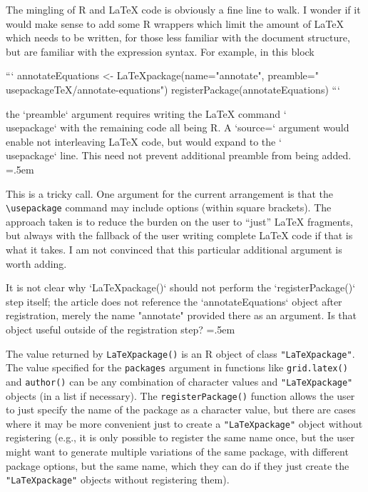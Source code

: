 \documentclass{article}
\newcommand{\code}[1]{\texttt{#1}}
\newenvironment{lcverbatim}
 {\SaveVerbatim{cverb}}
 {\endSaveVerbatim
  \flushleft\fboxrule=0pt\fboxsep=.5em
  \colorbox{cverbbg}{%
    \makebox[\dimexpr\linewidth-2\fboxsep][l]{\BUseVerbatim{cverb}}%
  }
  \endflushleft
}
\begin{document}
\begin{lcverbatim}
  The mingling of R and LaTeX code is obviously a fine line to walk. I wonder if
  it would make sense to add some R wrappers which limit the amount of LaTeX 
  which needs to be written, for those less familiar with the document 
  structure, but are familiar with the expression syntax. For example, in this 
  block

  ```
  annotateEquations <-
      LaTeXpackage(name="annotate",
                   preamble="\\usepackage{TeX/annotate-equations}")
  registerPackage(annotateEquations)
  ```

  the `preamble` argument requires writing the LaTeX command `\\usepackage{}`
  with the remaining code all being R. A `source=` argument would
  enable not interleaving LaTeX code, but would expand to the `\\usepackage{}`
  line. This need not prevent additional preamble from being added.
\end{lcverbatim}

This is a tricky call.  One argument for the current arrangement
is that the \verb|\usepackage| command may include options
(within square brackets).  The approach taken is to reduce the
burden on the user to ``just'' \LaTeX{} fragments, but always 
with the fallback of the user writing complete \LaTeX{} code if 
that is what it takes.
I am not convinced that this particular additional argument is worth adding.

\begin{lcverbatim}
  It is not clear why `LaTeXpackage()` should not perform the 
  `registerPackage()` step itself; the article does not reference the 
  `annotateEquations` object after registration, merely the name "annotate" 
  provided there as an argument. Is that object useful outside of the 
  registration step?
\end{lcverbatim}

The value returned by \code{LaTeXpackage()} is an R object of
class \verb|"LaTeXpackage"|.
The value specified for the \code{packages} argument in functions
like \code{grid.latex()} and \code{author()} can be any combination
of character values and \verb|"LaTeXpackage"| objects (in a list
if necessary).
The \code{registerPackage()} function allows the user to just
specify the name of the package as a character value, but there
are cases where it may be more convenient just to create a
\verb|"LaTeXpackage"| object without registering (e.g.,
it is only possible to register the same name once, but the
user might want to generate multiple variations of the same
package, with different package options, but the same name, which
they can do if they just create the \verb|"LaTeXpackage"| objects
without registering them).
\end{document}
